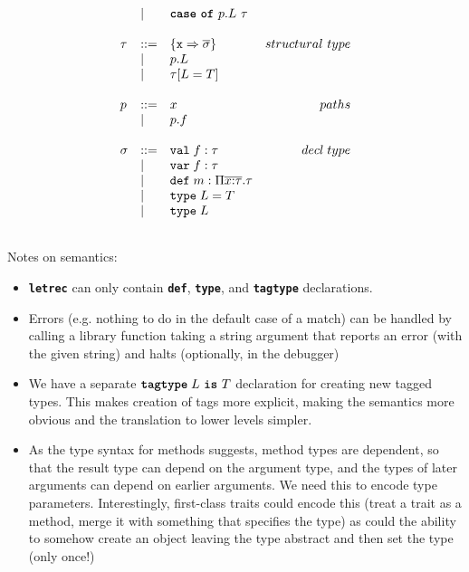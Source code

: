 \documentclass{article}
\newcommand{\keyw}[1]{\texttt{\textbf{#1}}}
\begin{document}
\[\begin{array}{lll}
\begin{array}{lllr}
& | & \keyw{case}~\keyw{of}~p.L~\tau &\\
&&\\
\tau & ::= & \{\texttt{x} \Rightarrow \overline{\sigma}\} & structural~type \\
& | & p.L &\\
& | & \tau[L=T] &\\
&&\\
p & ::= & x & paths \\
& | & p.f &\\
&&\\
\sigma & ::= & \texttt{val} \; f:\tau & decl \; type\\
       & |   & \texttt{var} \; f:\tau \\
       & |   & \texttt{def} \; m:\Pi \overline{x{:}\tau} . \tau \\
       & |   & \texttt{type} \; L = T &\\
       & |   & \texttt{type} \; L &\\
&&\\
\end{array}
\end{array}
\]

Notes on semantics:

\begin{itemize}

\item \keyw{letrec} can only contain \keyw{def}, \keyw{type}, and \keyw{tagtype} declarations.

\item Errors (e.g. nothing to do in the default case of a match) can be handled by calling a library function taking a string argument that reports an error (with the given string) and halts (optionally, in the debugger)

\item We have a separate $\keyw{tagtype} \; L~\keyw{is}~T$ declaration for creating new tagged types.  This makes creation of tags more explicit, making the semantics more obvious and the translation to lower levels simpler.

\item As the type syntax for methods suggests, method types are dependent, so that the result type can depend on the argument type, and the types of later arguments can depend on earlier arguments.  We need this to encode type parameters.  Interestingly, first-class traits could encode this (treat a trait as a method, merge it with something that specifies the type) as could the ability to somehow create an object leaving the type abstract and then set the type (only once!)

\end{itemize}
\end{document}

